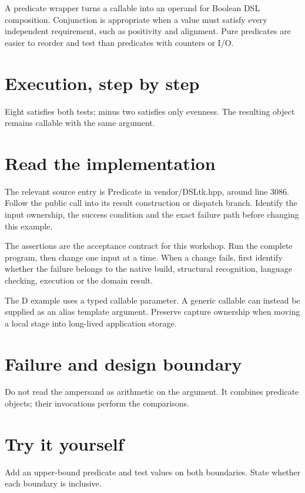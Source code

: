 \clearpage
{}
A predicate wrapper turns a callable into an operand for Boolean DSL composition. Conjunction is appropriate when a value must satisfy every independent requirement, such as positivity and alignment. Pure predicates are easier to reorder and test than predicates with counters or I/O.


\section*{Execution, step by step}
Eight satisfies both tests; minus two satisfies only evenness. The resulting object remains callable with the same argument.

\section*{Read the implementation}
The relevant source entry is Predicate in vendor/DSLtk.hpp, around line 3086. Follow the public call into its result construction or dispatch branch. Identify the input ownership, the success condition and the exact failure path before changing this example.

The assertions are the acceptance contract for this workshop. Run the complete program, then change one input at a time. When a change fails, first identify whether the failure belongs to the native build, structural recognition, language checking, execution or the domain result.

\clearpage
{}
The D example uses a typed callable parameter. A generic callable can instead be supplied as an alias template argument. Preserve capture ownership when moving a local stage into long-lived application storage.


\section*{Failure and design boundary}
Do not read the ampersand as arithmetic on the argument. It combines predicate objects; their invocations perform the comparisons.

\section*{Try it yourself}
Add an upper-bound predicate and test values on both boundaries. State whether each boundary is inclusive.

